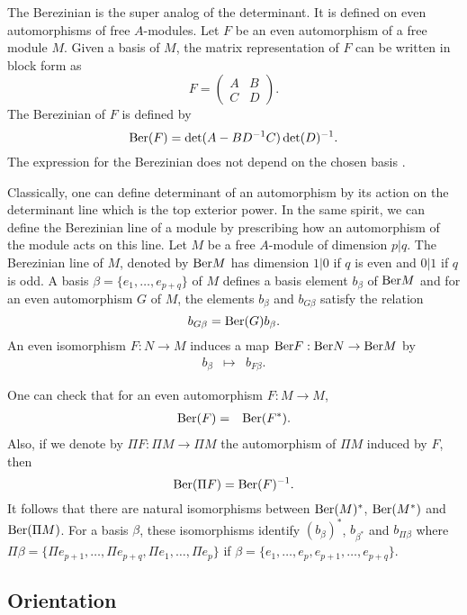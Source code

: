 \documentclass[11pt]{amsart}
\numberwithin{equation}{section}
\numberwithin{figure}{section}
\theoremstyle{plain}
\theoremstyle{definition}
\theoremstyle{remark}
\begin{document}
The Berezinian is the super analog of the determinant. It is defined
on even automorphisms of free $A$-modules. Let $F$ be an even automorphism
of a free module $M$. Given a basis of $M$, the matrix representation
of $F$ can be written in block form as 
\[
F=\left(\begin{matrix}A & B\\
C & D
\end{matrix}\right).
\]
The Berezinian of $F$ is defined by 
\[
\mathrm{Ber}(F)=\det(A-BD^{-1}C)\det(D)^{-1}.
\]
The expression for the Berezinian does not depend on the chosen basis
\cite[ 1.10]{NotesOnSuperSymmetry}.

Classically, one can define determinant of an automorphism by its
action on the determinant line which is the top exterior power. In
the same spirit, we can define the Berezinian line of a module by
prescribing how an automorphism of the module acts on this line. Let
$M$ be a free $A$-module of dimension $p|q$. The Berezinian line
of $M$, denoted by $\mathrm{Ber} M$ has dimension $1|0$ if $q$ is even
and $0|1$ if $q$ is odd. A basis $\beta=\{e_{1},\dots,e_{p+q}\}$
of $M$ defines a basis element $b_{\beta}$ of $\mathrm{Ber} M$ and for
an even automorphism $G$ of $M$, the elements $b_{\beta}$ and $b_{G\beta}$
satisfy the relation 
\[
b_{G\beta}=\mathrm{Ber}(G)b_{\beta}.
\]
An even isomorphism $F:N\rightarrow M$ induces a map $\mathrm{Ber} F:\mathrm{Ber} N\rightarrow\mathrm{Ber} M$
by 
\begin{eqnarray*}
b_{\beta} & \mapsto & b_{F\beta}.
\end{eqnarray*}


One can check that for an even automorphism $F:M\rightarrow M$, 
\begin{eqnarray*}
\mathrm{Ber}(F) & = & \mathrm{Ber}(F^{*}).
\end{eqnarray*}
Also, if we denote by $\Pi F:\Pi M\rightarrow\Pi M$ the automorphism
of $\Pi M$ induced by $F$, then 
\[
\mathrm{Ber}(\Pi F)=\mathrm{Ber}(F)^{-1}.
\]
It follows that there are natural isomorphisms between $\mathrm{Ber}(M)^{*}$,
$\mathrm{Ber}(M^{*})$ and $\mathrm{Ber}(\Pi M)$. For a basis $\beta$, these isomorphisms
identify $\left(b_{\beta}\right)^{*}$, $b_{\beta^{*}}$ and $b_{\Pi\beta}$
where $\Pi\beta=\{\Pi e_{p+1},\dots,\Pi e_{p+q},\Pi e_{1},\dots,\Pi e_{p}\}$
if $\beta=\{e_{1},\dots,e_{p},e_{p+1},\dots,e_{p+q}\}$.


\subsection{Orientation}
\end{document}

